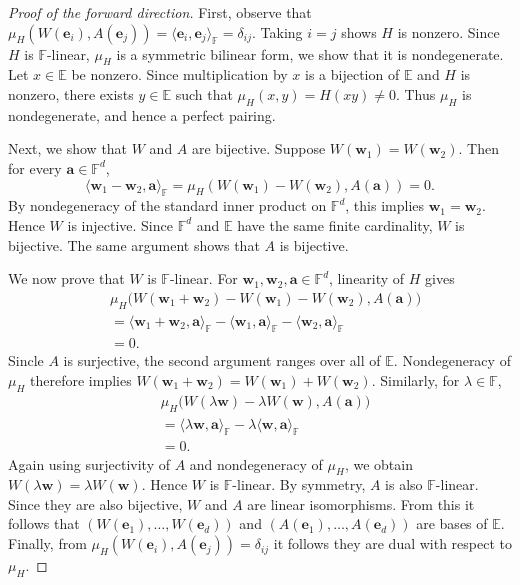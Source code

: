 \begin{proof}[Proof of the forward direction]
First, observe that $
\mu_H(W(\mathbf e_i),A(\mathbf e_j))
= \langle \mathbf e_i,\mathbf e_j\rangle_{\mathbb F}
= \delta_{ij}
$. Taking $i=j$ shows $H$ is nonzero. Since $H$ is $\mathbb{F}$-linear, $\mu_H$ is a symmetric bilinear form, we show that it is nondegenerate. Let $x\in\mathbb E$ be nonzero. Since multiplication by $x$ is a bijection of $\mathbb E$ and $H$ is nonzero, there exists $y\in\mathbb E$ such that $\mu_H(x,y)=H(xy)\neq 0$. Thus $\mu_H$ is nondegenerate, and hence a perfect pairing.

Next, we show that $W$ and $A$ are bijective. Suppose
$W(\mathbf w_1)=W(\mathbf w_2)$. Then for every
$\mathbf a\in\mathbb F^d$,
\[
\langle \mathbf w_1-\mathbf w_2,\mathbf a\rangle_{\mathbb F}
= \mu_H(W(\mathbf w_1) - W(\mathbf w_2), A(\mathbf a))
=0.
\]
By nondegeneracy of the standard inner product on $\mathbb F^d$, this
implies $\mathbf w_1=\mathbf w_2$. Hence $W$ is injective. Since
$\mathbb F^d$ and $\mathbb E$ have the same finite cardinality, $W$ is
bijective. The same argument shows that $A$ is bijective.

We now prove that $W$ is $\mathbb F$-linear. For
$\mathbf w_1,\mathbf w_2,\mathbf a\in\mathbb F^d$, linearity of $H$
gives
\[
\begin{aligned}
&\mu_H\bigl(
W(\mathbf w_1+\mathbf w_2)-W(\mathbf w_1)-W(\mathbf w_2),
A(\mathbf a)
\bigr)\\
&=
\langle \mathbf w_1+\mathbf w_2,\mathbf a\rangle_{\mathbb F}
-
\langle \mathbf w_1,\mathbf a\rangle_{\mathbb F}
-
\langle \mathbf w_2,\mathbf a\rangle_{\mathbb F}\\
&=0.
\end{aligned}
\]
Sincle $A$ is surjective, the second argument ranges over all of
$\mathbb E$. Nondegeneracy of $\mu_H$ therefore implies
$W(\mathbf w_1+\mathbf w_2) = W(\mathbf w_1)+W(\mathbf w_2)$. Similarly, for $\lambda\in\mathbb F$,
\[
\begin{aligned}
&\mu_H\bigl(
W(\lambda\mathbf w)-\lambda W(\mathbf w),
A(\mathbf a)
\bigr)\\
&=
\langle \lambda\mathbf w,\mathbf a\rangle_{\mathbb F}
-
\lambda\langle \mathbf w,\mathbf a\rangle_{\mathbb F}\\
&=0.
\end{aligned}
\]
Again using surjectivity of $A$ and nondegeneracy of $\mu_H$, we obtain $W(\lambda\mathbf w)=\lambda W(\mathbf w)$. Hence $W$ is $\mathbb F$-linear. By symmetry, $A$ is also
$\mathbb F$-linear. Since they are also bijective, $W$ and $A$ are linear isomorphisms. From this it follows that $\left(W(\mathbf e_1),\ldots,W(\mathbf e_d)\right)$ and $
\left(A(\mathbf e_1),\ldots,A(\mathbf e_d)\right)$ are bases of $\mathbb E$. Finally, from $\mu_H(W(\mathbf e_i),A(\mathbf e_j)) = \delta_{ij}$ it follows they are dual with respect to $\mu_H$.
\end{proof}

